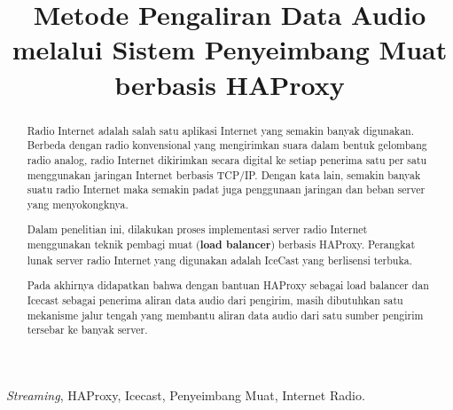 \documentclass[conference]{IEEEtran}
\begin{document}
	\title{Metode Pengaliran Data Audio melalui Sistem Penyeimbang Muat berbasis HAProxy}
\author{
    }
	
\maketitle
\begin{abstract}
    Radio Internet adalah salah satu aplikasi Internet yang semakin banyak digunakan. Berbeda dengan radio konvensional yang mengirimkan suara dalam bentuk gelombang radio analog, radio Internet dikirimkan secara digital ke setiap penerima satu per satu menggunakan jaringan Internet berbasis TCP/IP. Dengan kata lain, semakin banyak suatu radio Internet maka semakin padat juga penggunaan jaringan dan beban server yang menyokongknya.
    
    Dalam penelitian ini, dilakukan proses implementasi server radio Internet menggunakan teknik pembagi muat (\textbf{load balancer}) berbasis HAProxy. Perangkat lunak server radio Internet yang digunakan adalah IceCast yang berlisensi terbuka.
    
    Pada akhirnya didapatkan bahwa dengan bantuan HAProxy sebagai load balancer dan Icecast sebagai penerima aliran data audio dari pengirim, masih dibutuhkan satu mekanisme jalur tengah yang membantu aliran data audio dari satu sumber pengirim tersebar ke banyak server.
\end{abstract}
\begin{IEEEkeywords}
    \textit{Streaming}, HAProxy, Icecast, Penyeimbang Muat, Internet Radio.
\end{IEEEkeywords}


	







	
\end{document}
